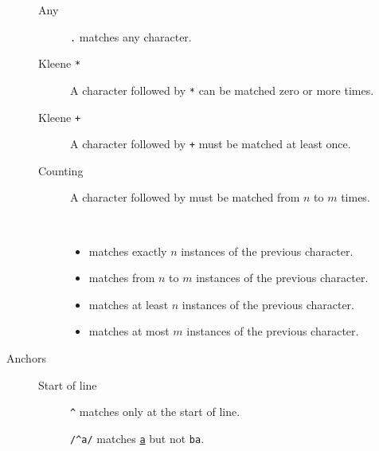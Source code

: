 \begin{description}
\begin{description}
            \item[Any]
                \texttt{.} matches any character.

            \item[Kleene \texttt{*}]
                A character followed by \texttt{*} can be matched zero or more times.

            \item[Kleene \texttt{+}]
                A character followed by \texttt{+} must be matched at least once.

            \item[Counting]
                A character followed by \texttt{} must be matched from $n$ to $m$ times.

                \begin{example} \phantom{}\\[-1.5em]
                    \begin{itemize}
                        \item \texttt{} matches exactly $n$ instances of the previous character.

                        \item \texttt{} matches from $n$ to $m$ instances of the previous character.

                        \item \texttt{} matches at least $n$ instances of the previous character.
                        
                        \item \texttt{} matches at most $m$ instances of the previous character.
                    \end{itemize}
                \end{example}
        \end{description}

    \item[Anchors] \phantom{}
        \begin{description}
            \item[Start of line]
                \texttt{\textasciicircum} matches only at the start of line.

                \begin{example}
                    \texttt{/\textasciicircum a/} matches \texttt{\underline{a}} but not \texttt{ba}.
                \end{example}


\end{description}
\end{description}
